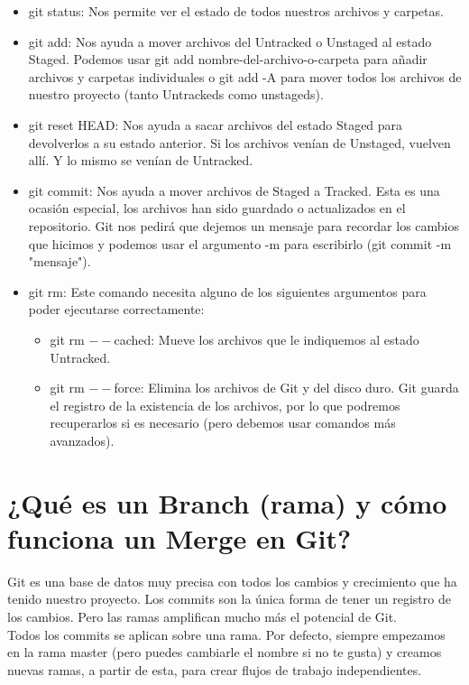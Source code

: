 \documentclass{article}
\begin{document}
\begin{itemize}
  \item git status: Nos permite ver el estado de todos nuestros archivos y
    carpetas.
  \item git add: Nos ayuda a mover archivos del Untracked o Unstaged al estado
    Staged. Podemos usar git add nombre-del-archivo-o-carpeta para añadir
    archivos y carpetas individuales o git add -A para mover todos los archivos
    de nuestro proyecto (tanto Untrackeds como unstageds).
  \item git reset HEAD: Nos ayuda a sacar archivos del estado Staged para
    devolverlos a su estado anterior. Si los archivos venían de Unstaged,
    vuelven allí. Y lo mismo se venían de Untracked.
  \item git commit: Nos ayuda a mover archivos de Staged a Tracked. Esta es una
    ocasión especial, los archivos han sido guardado o actualizados en el
    repositorio. Git nos pedirá que dejemos un mensaje para recordar los
    cambios que hicimos y podemos usar el argumento -m para escribirlo (git
    commit -m "mensaje").
  \item git rm: Este comando necesita alguno de los siguientes argumentos para
    poder ejecutarse correctamente:
  \begin{itemize}
    \item git rm $--$cached: Mueve los archivos que le indiquemos al estado
      Untracked.
    \item git rm $--$force: Elimina los archivos de Git y del disco duro. Git
      guarda el registro de la existencia de los archivos, por lo que podremos
      recuperarlos si es necesario (pero debemos usar comandos más avanzados).
  \end{itemize}
\end{itemize}

\newpage

\section{¿Qué es un Branch (rama) y cómo funciona un Merge en Git?}%
Git es una base de datos muy precisa con todos los cambios y crecimiento que ha
tenido nuestro proyecto. Los commits son la única forma de tener un registro de
los cambios. Pero las ramas amplifican mucho más el potencial de Git.\\

Todos los commits se aplican sobre una rama. Por defecto, siempre empezamos en
la rama master (pero puedes cambiarle el nombre si no te gusta) y creamos
nuevas ramas, a partir de esta, para crear flujos de trabajo independientes.\\
\end{document}
